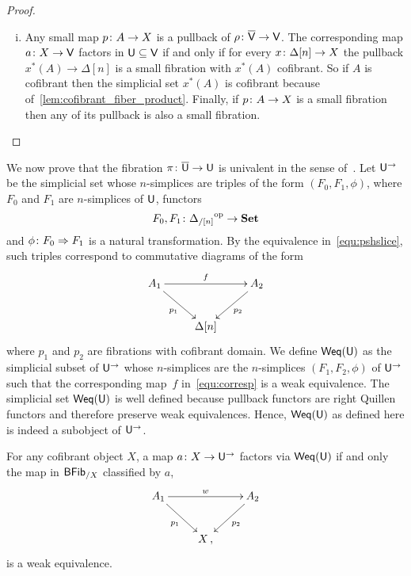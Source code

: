 \documentclass[reqno,10pt,a4paper,oneside,draft]{amsart}
\begin{document}
\begin{proof}
\begin{enumerate}[(i)]
\item Any small map $p \colon A \rightarrow X$ is a pullback of $\rho \colon \overline{\mathsf{V}} \rightarrow \mathsf{V}$. The corresponding map $a \colon X \rightarrow \mathsf{V}$ factors in $\mathsf{U} \subseteq \mathsf{V}$ if and only if for every $x \colon \Delta[n] \rightarrow X$ the pullback $x^*(A) \rightarrow \Delta[n]$   is a small fibration with $x^*(A)$ cofibrant. So if $A$ is cofibrant then the simplicial set $x^*(A)$ is cofibrant because of~\cref{lem:cofibrant_fiber_product}. Finally, if $p \colon A \rightarrow X$ is a small fibration then any of its pullback is also a small fibration.  \qedhere
\end{enumerate}
\end{proof} 





We now prove that the fibration $\pi \colon \overline{\mathsf{U}} \to \mathsf{U}$ is univalent in the sense of~\cite{voevodsky-simplicial-model}.
Let $\mathsf{U}^{\rightarrow}$ be the simplicial set whose $n$-simplices are triples of the form $(F_0, F_1, \phi)$, where $F_0$ and $F_1$ are $n$-simplices of $\mathsf{U}$, \ie functors
 \[
F_0, F_1 \colon {\Delta_{/[n]}}^{\operatorname{op}} \rightarrow \mathbf{Set}
\]
and $\phi \colon F_0 \Rightarrow F_1$ is a natural transformation. By the equivalence in~\eqref{equ:pshslice},
such triples correspond to commutative diagrams of the form
\begin{equation}
\label{equ:corresp}
\begin{gathered}
\xymatrix{ 
A_1 \ar[rr]^{f} \ar[dr]_{p_1} & & A_2 \ar[dl]^{p_2} \\
& \Delta[n] & }
\end{gathered}
\end{equation}
where $p_1$ and $p_2$ are fibrations with cofibrant domain.
We define $\mathsf{Weq}(\mathsf{U})$ as the simplicial subset of $\mathsf{U}^\to$ whose $n$-simplices are the $n$-simplices $(F_1, F_2, \phi)$ of $\mathsf{U}^\to$ such that the corresponding map~$f$ in~\eqref{equ:corresp} is a weak equivalence.
The simplicial set $\mathsf{Weq}(\mathsf{U})$ is well defined because pullback functors are right Quillen functors \cite[???]{henry2019qms} and therefore preserve weak equivalences. Hence, 
$\mathsf{Weq}(\mathsf{U})$ as defined here is indeed a subobject of $\mathsf{U}^{\rightarrow}$. 

\begin{lemma}
\label{prop:Weq_classify_Weq}
For any cofibrant object $X$, a map $a \colon X \rightarrow \mathsf{U}^{\rightarrow}$ factors via 
 $\mathsf{Weq}(\mathsf{U})$ if and only the map in $\mathsf{BFib}_{/X}$ classified by $a$,
\[
\xymatrix{
A_1 \ar[rr]^w  \ar[dr]_{p_1} & & A_2 \ar[dl]^{p_2} \\
 & X \, , & }
 \]
is a weak equivalence.
\end{lemma}
\end{document}
